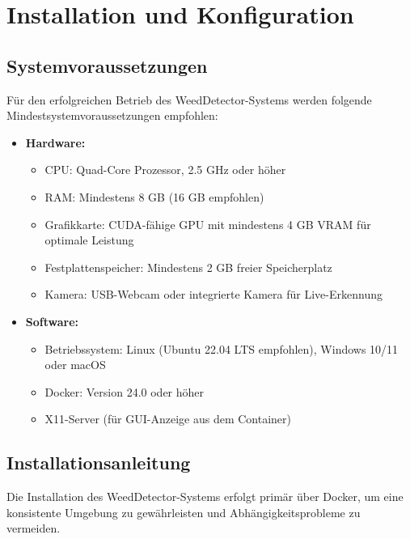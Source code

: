 \documentclass[12pt, a4paper]{scrreprt}
\begin{document}
\chapter{Installation und Konfiguration}

\section{Systemvoraussetzungen}
Für den erfolgreichen Betrieb des WeedDetector-Systems werden folgende Mindestsystemvoraussetzungen empfohlen:

\begin{itemize}
    \item \textbf{Hardware:}
    \begin{itemize}
        \item CPU: Quad-Core Prozessor, 2.5 GHz oder höher
        \item RAM: Mindestens 8 GB (16 GB empfohlen)
        \item Grafikkarte: CUDA-fähige GPU mit mindestens 4 GB VRAM für optimale Leistung
        \item Festplattenspeicher: Mindestens 2 GB freier Speicherplatz
        \item Kamera: USB-Webcam oder integrierte Kamera für Live-Erkennung
    \end{itemize}
    \item \textbf{Software:}
    \begin{itemize}
        \item Betriebssystem: Linux (Ubuntu 22.04 LTS empfohlen), Windows 10/11 oder macOS
        \item Docker: Version 24.0 oder höher
        \item X11-Server (für GUI-Anzeige aus dem Container)
    \end{itemize}
\end{itemize}

\section{Installationsanleitung}
Die Installation des WeedDetector-Systems erfolgt primär über Docker, um eine konsistente Umgebung zu gewährleisten und Abhängigkeitsprobleme zu vermeiden.
\end{document}
